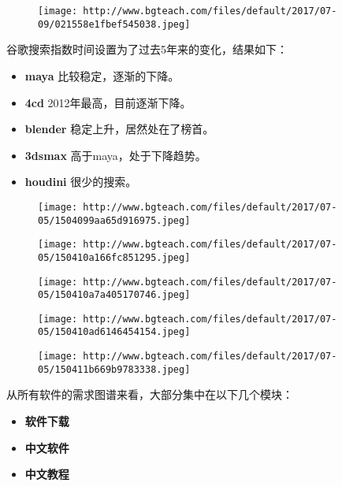 \documentclass[]{article}
\begin{document}
\begin{figure}
\centering
\texttt{[image: http://www.bgteach.com/files/default/2017/07-09/021558e1fbef545038.jpeg]}
\caption{}
\end{figure}

谷歌搜索指数时间设置为了过去5年来的变化，结果如下：

\begin{itemize}
\item
  \textbf{maya }比较稳定，逐渐的下降。
\item
  \textbf{4cd }2012年最高，目前逐渐下降。
\item
  \textbf{blender }稳定上升，居然处在了榜首。
\item
  \textbf{3dsmax} 高于maya，处于下降趋势。
\item
  \textbf{houdini} 很少的搜索。
\end{itemize}

\begin{figure}
\centering
\texttt{[image: http://www.bgteach.com/files/default/2017/07-05/1504099aa65d916975.jpeg]}
\caption{}
\end{figure}

\begin{figure}
\centering
\texttt{[image: http://www.bgteach.com/files/default/2017/07-05/150410a166fc851295.jpeg]}
\caption{}
\end{figure}

\begin{figure}
\centering
\texttt{[image: http://www.bgteach.com/files/default/2017/07-05/150410a7a405170746.jpeg]}
\caption{}
\end{figure}

\begin{figure}
\centering
\texttt{[image: http://www.bgteach.com/files/default/2017/07-05/150410ad6146454154.jpeg]}
\caption{}
\end{figure}

\begin{figure}
\centering
\texttt{[image: http://www.bgteach.com/files/default/2017/07-05/150411b669b9783338.jpeg]}
\caption{}
\end{figure}

从所有软件的需求图谱来看，大部分集中在以下几个模块：

\begin{itemize}
\item
  \textbf{软件下载}
\item
  \textbf{中文软件}
\item
  \textbf{中文教程}
\end{itemize}
\end{document}
